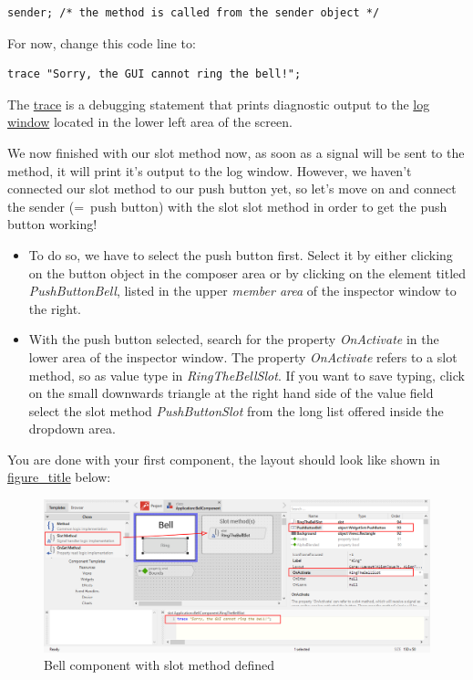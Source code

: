 \documentclass[
  a4paper,
,tablecaptionabove
]{scrbook}
\begin{document}
\begin{verbatim}
sender; /* the method is called from the sender object */
\end{verbatim}

For now, change this code line to:

\begin{verbatim}
trace "Sorry, the GUI cannot ring the bell!";
\end{verbatim}

The \href{https://doc.embedded-wizard.de/trace-statemen}{trace} is a
debugging statement that prints diagnostic output to the
\href{https://doc.embedded-wizard.de/log-window}{log window} located in
the lower left area of the screen.

We now finished with our slot method now, as soon as a signal will be
sent to the method, it will print it's output to the log window.
However, we haven't connected our slot method to our push button yet, so
let's move on and connect the sender (=~push button) with the slot slot
method in order to get the push button working!

\begin{itemize}
\item
  To do so, we have to select the push button first. Select it by either
  clicking on the button object in the composer area or by clicking on
  the element titled \emph{PushButtonBell}, listed in the upper
  \emph{member area} of the inspector window to the right.
\item
  With the push button selected, search for the property
  \emph{OnActivate} in the lower area of the inspector window. The
  property \emph{OnActivate} refers to a slot method, so as value type
  in \emph{RingTheBellSlot}. If you want to save typing, click on the
  small downwards triangle at the right hand side of the value field
  select the slot method \emph{PushButtonSlot} from the long list
  offered inside the dropdown area.
\end{itemize}

You are done with your first component, the layout should look like
shown in \protect\hyperlink{fig:BellComponentWithSlot}{figure\_title}
below:

\begin{figure}
\centering
\includegraphics{./../asciidoc/modules/ROOT/assets/images/firstcomponent/BellComponentSlot.png}
\caption{Bell component with slot method defined}
\end{figure}
\end{document}
